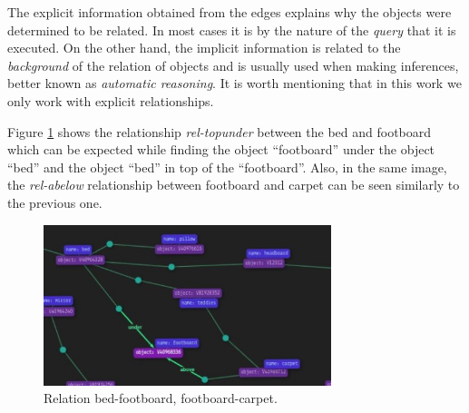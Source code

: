 The explicit information obtained from the edges explains why the objects were determined to be related. In most cases it is by the nature of the \textit{query} that it is executed. On the other hand, the implicit information is related to the \textit{background} of the relation of objects and is usually used when making inferences, better known as \textit{automatic reasoning}. It is worth mentioning that in this work we only work with explicit relationships.

Figure \ref{fig:ReGra} shows the relationship \textit{rel-topunder} between the bed and footboard which can be expected while finding the object ``footboard'' under the object ``bed'' and the object ``bed'' in top of the ``footboard''. Also, in the same image, the \textit{rel-abelow} relationship between footboard and carpet can be seen similarly to the previous one.

\begin{figure}[H]
    \centering
    \includegraphics[width=8.4cm]{figures/realcionGrafo.jpeg}
    \caption{Relation bed-footboard, footboard-carpet.}
    \label{fig:ReGra}
\end{figure}

